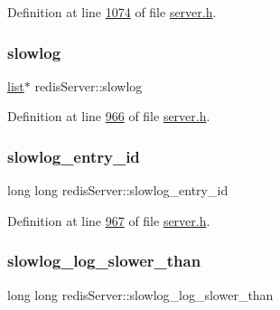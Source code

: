 Definition at line \hyperlink{server_8h_source_l01074}{1074} of file \hyperlink{server_8h_source}{server.\+h}.

\mbox{\label{structredisServer_a993787185c30cf01dd46855659dc5b50}} 
\subsubsection{\texorpdfstring{slowlog}{slowlog}}
{\footnotesize\ttfamily \hyperlink{structlist}{list}$\ast$ redis\+Server\+::slowlog}



Definition at line \hyperlink{server_8h_source_l00966}{966} of file \hyperlink{server_8h_source}{server.\+h}.

\mbox{\label{structredisServer_ae661058eebe4652bffb5ad00985f1ad6}} 
\subsubsection{\texorpdfstring{slowlog\+\_\+entry\+\_\+id}{slowlog\_entry\_id}}
{\footnotesize\ttfamily long long redis\+Server\+::slowlog\+\_\+entry\+\_\+id}



Definition at line \hyperlink{server_8h_source_l00967}{967} of file \hyperlink{server_8h_source}{server.\+h}.

\mbox{\label{structredisServer_a80b82bc07f20c8da66e296c2b371e737}} 
\subsubsection{\texorpdfstring{slowlog\+\_\+log\+\_\+slower\+\_\+than}{slowlog\_log\_slower\_than}}
{\footnotesize\ttfamily long long redis\+Server\+::slowlog\+\_\+log\+\_\+slower\+\_\+than}



